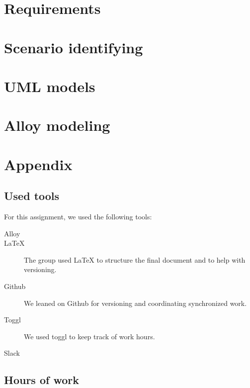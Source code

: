 \documentclass{article}
\begin{document}
	\newpage
	\section{Requirements}

	\newpage
	\section{Scenario identifying}
	
		

	\newpage
	\section{UML models}
	

	\newpage
	\section{Alloy modeling}

	\newpage
	\section{Appendix}
		\listoffigures
		\listoftables
		
		\subsection{Used tools}
		For this assignment, we used the following tools:
		
		\begin{description}
			\item [Alloy]
			\item [LaTeX] The group used LaTeX to structure the final document and to help with versioning.
			\item [Github] We leaned on Github for versioning and coordinating synchronized work.
			\item [Toggl] We used toggl to keep track of work hours.
			\item [Slack]  
			
		\end{description}
		
		\subsection{Hours of work}
\end{document}
